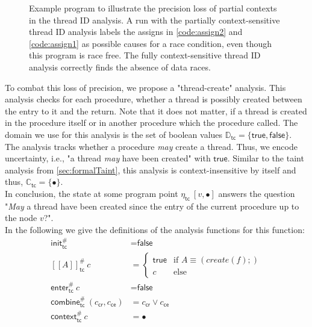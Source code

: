   \begin{figure}
    \centering
    \begin{subfigure}{.35\textwidth}
      \centering
      
    \end{subfigure}
    \caption{Example program to illustrate the precision loss of partial contexts in the thread ID analysis. A run with the partially context-sensitive thread ID analysis labels the assigns in \autoref{code:assign2} and \autoref{code:assign1} as possible causes for a race condition, even though this program is race free. The fully context-sensitive thread ID analysis correctly finds the absence of data races.}
    \label{fig:example_thread}
  \end{figure}

  To combat this loss of precision, we propose a "thread-create" analysis. This analysis checks for each procedure, whether a thread is possibly created between the entry to it and the return. Note that it does not matter, if a thread is created in the procedure itself or in another procedure which the procedure called. The domain we use for this analysis is the set of boolean values $\mathbb{D}_\textsf{tc} = \{\textsf{true}, \textsf{false}\}$. The analysis tracks whether a procedure \textit{may} create a thread. Thus, we encode uncertainty, i.e., "a thread \textit{may} have been created" with $\textsf{true}$. Similar to the taint analysis from \autoref{sec:formalTaint}, this analysis is context-insensitive by itself and thus, $\mathbb{C}_\textsf{tc} = \{\bullet\}$.\\
  In conclusion, the state at some program point $\eta_\textsf{tc}\ [v,\bullet]$ answers the question "\textit{May} a thread have been created since the entry of the current procedure up to the node $v$?".\\
  In the following we give the definitions of the analysis functions for this function:
  \begin{align*}
    \textsf{init}^{\#}_\textsf{tc} &= \textsf{false}\\
    [\![ A ]\!]^{\#}_\textsf{tc}\ c &= \left\{ \begin{array}{ll}
      \textsf{true} & \text{if }A \equiv (create(f);)\\
      c & \text{else}
    \end{array} \right. \\
    \textsf{enter}^{\#}_\textsf{tc}\ c &= \textsf{false}\\
    \textsf{combine}^{\#}_\textsf{tc}\ (c_\textsf{cr}, c_\textsf{ce}) &= c_\textsf{cr} \lor c_\textsf{ce}\\
    \textsf{context}^{\#}_\textsf{tc}\ c &= \bullet\\
  \end{align*}
  
